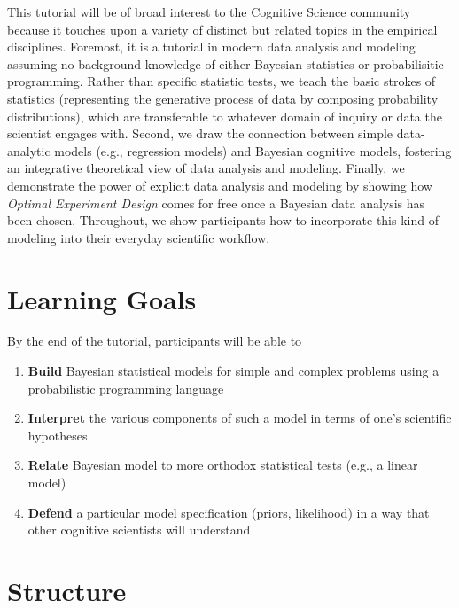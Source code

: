 \documentclass[10pt,letterpaper]{article}
\providecommand{\tightlist}{%
  \setlength{\itemsep}{0pt}\setlength{\parskip}{0pt}}
\begin{document}
This tutorial will be of broad interest to the Cognitive Science community because it touches upon a variety of distinct but related topics in the empirical disciplines. 
Foremost, it is a tutorial in modern data analysis and modeling assuming no background knowledge of either Bayesian statistics or probabilisitic programming. 
Rather than specific statistic tests, we teach the basic strokes of statistics (representing the generative process of data by composing probability distributions), which are transferable to whatever domain of inquiry or data the scientist engages with. 
Second, we draw the connection between simple data-analytic models (e.g., regression models) and Bayesian cognitive models, fostering an integrative theoretical view of data analysis and modeling.
Finally, we demonstrate the power of explicit data analysis and modeling by showing how \emph{Optimal Experiment Design} comes for free once a Bayesian data analysis has been chosen.
Throughout, we show participants how to incorporate this kind of modeling into their everyday scientific workflow. 



\section{Learning Goals}

By the end of the tutorial, participants will be able to 

\begin{enumerate}
\tightlist
\item \textbf{Build} Bayesian statistical models for simple and complex problems using a probabilistic programming language 
\item \textbf{Interpret} the various components of such a model in terms of one's scientific hypotheses 
\item \textbf{Relate} Bayesian model to more orthodox statistical tests (e.g., a linear model) 
\item \textbf{Defend} a particular model specification (priors, likelihood) in a way that other cognitive scientists will understand
\end{enumerate}

\section{Structure}
\end{document}
